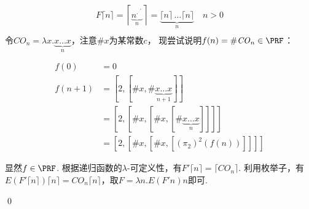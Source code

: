 \begin{pf} \rm 
   $$
\begin{aligned}
    F \lceil n \rceil = \left\lceil \underbrace{n^{.^{.^{.^n}}}}_{n} \right\rceil = \underbrace{\lceil n \rceil\,\dots\lceil n \rceil}_{n}  \quad n>0 \\ 
\end{aligned}
   $$
   令$\mathit{CO}_n = \lambda x.\underbrace{x\dots x}_{n}$，注意$\#x$为某常数$c$，
   现尝试说明$f(n) = \#\mathit{CO}_n \in\PRF$：
   
    $$
    \begin{aligned}
        f(0) &= 0\\
        f(n+1) &= [2, [\#x, \#\underbrace{x\dots x}_{n+1}]]\\
        &= [2, [\#x, [\#x, [\#\underbrace{x\dots x}_{n}]]]]\\
        &= [2, [\#x, [\#x, [(\pi_2)^2(f(n))]]]]
    \end{aligned}
    $$

   显然$f\in\PRF$. 根据递归函数的$\lambda$-可定义性，有$F'\lceil n\rceil = \lceil \mathit{CO}_n \rceil$. 利用枚举子，有$E (F' \lceil n \rceil) \lceil n \rceil = CO_n \lceil n \rceil$，取$F = \lambda n. E (F' n) n$即可.
   
   \qed
\end{pf}